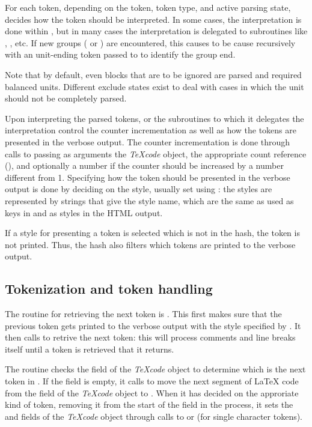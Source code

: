 \documentclass{article}
\newcommand\Obj[1]{\textsl{#1}}
\newcommand\wild{\ldots}
\begin{document}
For each token, depending on the token, token type, and active parsing state,  decides how the token should be interpreted. In some cases, the interpretation is done within , but in many cases the interpretation is delegated to subroutines like , , etc. If new groups (\code{\{\ldots\}} or ) are encountered, this causes  to be cause recursively with an unit-ending token passed to  to identify the group end.
  
Note that by default, even blocks that are to be ignored are parsed and required balanced units. Different exclude states exist to deal with cases in which the unit should not be completely parsed.

Upon interpreting the parsed tokens,  or the subroutines to which it delegates the interpretation control the counter incrementation as well as how the tokens are presented in the verbose output. The counter incrementation is done through calls to  passing as arguments the \Obj{TeXcode} object, the appropriate count reference (\code{\$CNT_\wild}), and optionally a number if the counter should be increased by a number different from 1. Specifying how the token should be presented in the verbose output is done by deciding on the style, usually set using : the styles are represented by strings that give the style name, which are the same as used as keys in  and as styles in the HTML output.

If a style for presenting a token is selected which is not in the  hash, the token is not printed. Thus, the  hash also filters which tokens are printed to the verbose output.


\subsection{Tokenization and token handling}

The routine for retrieving the next token is . This first makes sure that the previous token gets printed to the verbose output with the style specified by . It then calls  to retrive the next token: this will process comments and line breaks itself until a token is retrieved that it returns.

The  routine checks the  field of the \Obj{TeXcode} object to determine which is the next token in . If the  field is empty, it calls  to move the next segment of \LaTeX{} code from the  field of the \Obj{TeXcode} object to . When it has decided on the approriate kind of token, removing it from the start of the  field in the process, it sets the  and  fields of the \Obj{TeXcode} object through calls to  or  (for single character tokens).
\end{document}
